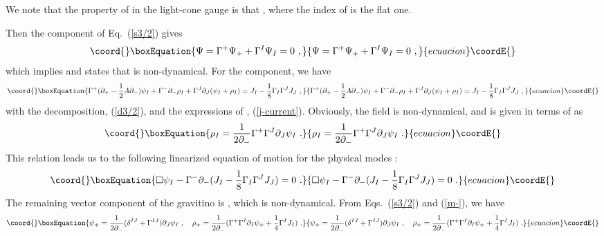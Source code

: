 \documentclass[a4paper,12pt]{article}
\numberwithin{equation}{section}
\begin{document}
We note that the property of \coordHE{} in the light-cone gauge is that
\coordHE{}, where the index of \coordHE{} is
the flat one.

Then the \myHighlight{$\mu = -$}\coordHE{} component of Eq.~(\ref{s3/2}) gives
\begin{equation}\coord{}\boxEquation{
\Psi = \Gamma^+ \Psi_+ + \Gamma^I \Psi_I = 0 ~,
\label{m-}
}{
\Psi = \Gamma^+ \Psi_+ + \Gamma^I \Psi_I = 0 ~,
}{ecuacion}\coordE{}\end{equation}
which implies \coordHE{} and states that \myHighlight{$\Psi_+$}\coordHE{}
is non-dynamical.  For the \coordHE{} component, we have
\begin{equation}\coord{}\boxEquation{
\Gamma^+ ( \partial_+ - \frac{1}{2} A \partial_- ) \psi_I
       + \Gamma^- \partial_- \rho_I
       + \Gamma^J \partial_J (\psi_I + \rho_I)
 = J_I - \frac{1}{8} \Gamma_I \Gamma^J J_J ~,
}{
\Gamma^+ ( \partial_+ - \frac{1}{2} A \partial_- ) \psi_I
       + \Gamma^- \partial_- \rho_I
       + \Gamma^J \partial_J (\psi_I + \rho_I)
 = J_I - \frac{1}{8} \Gamma_I \Gamma^J J_J ~,
}{ecuacion}\coordE{}\end{equation}
with the decomposition, (\ref{d3/2}), and the expressions of \coordHE{},
(\ref{j-current}).  Obviously, the \coordHE{} field is non-dynamical,
and is given in terms of \coordHE{} as
\begin{equation}\coord{}\boxEquation{
\rho_I = \frac{1}{2 \partial_-}
        \Gamma^+ \Gamma^J \partial_J \psi_I ~.
}{
\rho_I = \frac{1}{2 \partial_-}
        \Gamma^+ \Gamma^J \partial_J \psi_I ~.
}{ecuacion}\coordE{}\end{equation}
This relation leads us to the following linearized equation of motion
for the physical modes \coordHE{}:
\begin{equation}\coord{}\boxEquation{
\Box \psi_I - \Gamma^- \partial_-
(J_I - \frac{1}{8} \Gamma_I \Gamma^J J_J ) = 0 ~.
\label{gravi-eq}
}{
\Box \psi_I - \Gamma^- \partial_-
(J_I - \frac{1}{8} \Gamma_I \Gamma^J J_J ) = 0 ~.
}{ecuacion}\coordE{}\end{equation}
The remaining vector component of the gravitino is \myHighlight{$\Psi_+$}\coordHE{}, which is
non-dynamical.  From Eqs.~(\ref{s3/2}) and (\ref{m-}), we have
\begin{equation}\coord{}\boxEquation{
\psi_+ = \frac{1}{2 \partial_-}
   ( \delta^{IJ} + \Gamma^{IJ} ) \partial_J \psi_I ~,~~~
\rho_+ = \frac{1}{2 \partial_-}
  ( \Gamma^+ \Gamma^I \partial_I \psi_+
   + \frac{1}{4} \Gamma^I J_I ) ~.
}{
\psi_+ = \frac{1}{2 \partial_-}
   ( \delta^{IJ} + \Gamma^{IJ} ) \partial_J \psi_I ~,~~~
\rho_+ = \frac{1}{2 \partial_-}
  ( \Gamma^+ \Gamma^I \partial_I \psi_+
   + \frac{1}{4} \Gamma^I J_I ) ~.
}{ecuacion}\coordE{}\end{equation}
\end{document}

